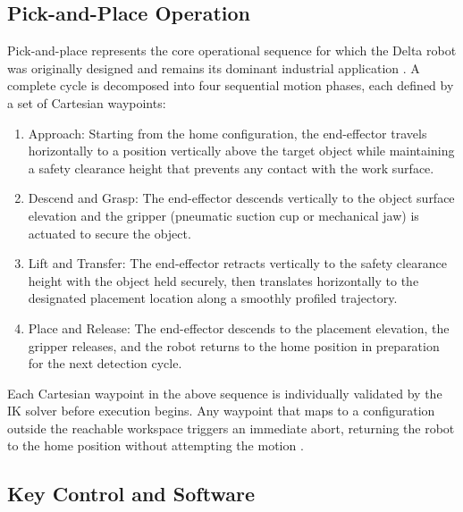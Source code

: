 \subsection{Pick-and-Place Operation}
\hspace{1.27cm}
Pick-and-place represents the core operational sequence for which
the Delta robot was originally designed and remains its dominant
industrial application \autocite{biagiotti-2008}. A complete
cycle is decomposed into four sequential motion phases, each
defined by a set of Cartesian waypoints:

\begin{enumerate}
    \item Approach: Starting from the home configuration,
    the end-effector travels horizontally to a position vertically
    above the target object while maintaining a safety clearance
    height that prevents any contact with the work surface.

    \item Descend and Grasp: The end-effector descends
    vertically to the object surface elevation and the gripper
    (pneumatic suction cup or mechanical jaw) is actuated to
    secure the object.

    \item Lift and Transfer: The end-effector retracts
    vertically to the safety clearance height with the object
    held securely, then translates horizontally to the designated
    placement location along a smoothly profiled trajectory.

    \item Place and Release: The end-effector descends
    to the placement elevation, the gripper releases, and the
    robot returns to the home position in preparation for the
    next detection cycle.
\end{enumerate}

\hspace{1.27cm}
Each Cartesian waypoint in the above sequence is individually
validated by the IK solver before execution begins. Any waypoint
that maps to a configuration outside the reachable workspace
triggers an immediate abort, returning the robot to the home
position without attempting the motion \autocite{yamtuan-2023}.

\subsection{Key Control and Software}

